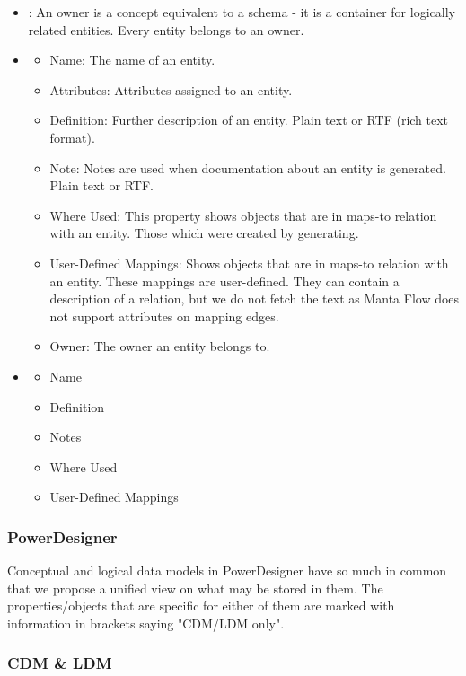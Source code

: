 \begin{itemize}
	\item {}: An owner is a concept equivalent to a schema - it is a container for logically related entities. Every entity belongs to an owner.
	\item {}
	\begin{itemize}
		\item Name: The name of an entity.
		\item Attributes: Attributes assigned to an entity.
		\item Definition: Further description of an entity. Plain text or RTF (rich text format).
		\item Note: Notes are used when documentation about an entity is generated. Plain text or RTF.
		\item Where Used: This property shows objects that are in maps-to relation with an entity. Those which were created by generating.
		\item User-Defined Mappings: Shows objects that are in maps-to relation with an entity. These mappings are user-defined. They can contain a description of a relation, but we do not fetch the text as Manta Flow does not support attributes on mapping edges.
		\item Owner: The owner an entity belongs to.
	\end{itemize}
	\item {}
	\begin{itemize}
		\item Name
		\item Definition
		\item Notes
		\item Where Used
		\item User-Defined Mappings
	\end{itemize}
\end{itemize}


\subsubsection{PowerDesigner}

Conceptual and logical data models in PowerDesigner have so much in common that we propose a unified view on what may be stored in them. The properties/objects that are specific for either of them are marked with information in brackets saying "CDM/LDM only".

\subsubsection{CDM \& LDM}

